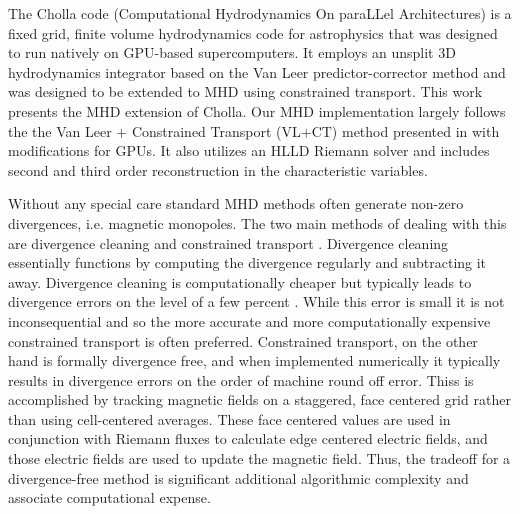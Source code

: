 The Cholla code (Computational Hydrodynamics On paraLLel Architectures)\citep{schneider_2015} is a fixed grid, finite volume hydrodynamics code for astrophysics that was designed to run natively on GPU-based supercomputers. It employs an unsplit 3D hydrodynamics integrator based on the Van Leer predictor-corrector method  and was designed to be extended to MHD using constrained transport. This work presents the MHD extension of Cholla. Our MHD implementation largely follows the the Van Leer + Constrained Transport (VL+CT) method presented in \cite{stone_2009} with modifications for GPUs. It also utilizes an HLLD Riemann solver and includes second and third order reconstruction in the characteristic variables.

Without any special care standard MHD methods often generate non-zero divergences, i.e. magnetic monopoles. The two main methods of dealing with this are divergence cleaning \citep{dedner_hyperbolic_2002} and constrained transport \citep{evans_1988}. Divergence cleaning essentially functions by computing the divergence regularly and subtracting it away. Divergence cleaning is computationally cheaper but typically leads to divergence errors on the level of a few percent \citep{pakmor_magnetizing_2020,van_de_voort_effect_2021}. While this error is small it is not inconsequential and so the more accurate and more computationally expensive constrained transport is often preferred. Constrained transport, on the other hand is formally divergence free, and when implemented numerically it typically results in divergence errors on the order of machine round off error\citep{evans_1988,stone_athena_2008, stone_2009}. Thiss is accomplished by tracking magnetic fields on a staggered, face centered grid rather than using cell-centered averages. These face centered values are used in conjunction with Riemann fluxes to calculate edge centered electric fields, and those electric fields are used to update the magnetic field\citep{evans_1988,stone_athena_2008, stone_2009}. Thus, the tradeoff for a divergence-free method is significant additional algorithmic complexity and associate computational expense.

